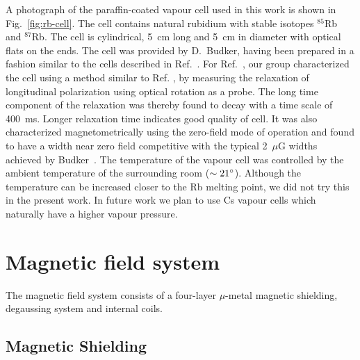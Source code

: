 A photograph of the paraffin-coated vapour cell used in this work is
shown in Fig.~\ref{fig:rb-cell}.  The cell contains natural rubidium
with stable isotopes $^{85}$Rb and $^{87}$Rb.  The cell is
cylindrical, 5~cm long and 5~cm in diameter with optical flats on the
ends.  The cell was provided by D.~Budker, having been prepared in a
fashion similar to the cells described in
Ref.~\cite{PhysRevA.72.023401}.  For Ref.~\cite{Martin:2014foa},
our group characterized the cell using a method similar to
Ref. \cite{PhysRevA.72.023401}, by measuring the relaxation of
longitudinal polarization using optical rotation as a probe.  The long
time component of the relaxation was thereby found to decay with a
time scale of 400~ms.  Longer relaxation time indicates good quality
of cell.  It was also characterized magnetometrically using the
zero-field mode of operation and found to have a width near zero field
competitive with the typical 2~$\mu$G widths achieved by
Budker~\cite{bib:UltranarrowWidths}.  The temperature of the
vapour cell was controlled by the ambient temperature of the
surrounding room ($\sim 21\degree$).  Although the temperature can be
increased closer to the Rb melting point, we did not try this in the
present work.  In future work we plan to use Cs vapour cells which
naturally have a higher vapour pressure.

\section{Magnetic field system}

The magnetic field system consists of a four-layer $\mu$-metal
magnetic shielding, degaussing system and internal coils.

\subsection{Magnetic Shielding}

